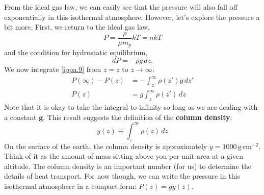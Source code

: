 \documentclass[10pt]{article}
\numberwithin{equation}{section}
\newcommand{\n}{\noindent}
\begin{document}
	\n From the ideal gas law, we can easily see that the pressure will 
also fall off exponentially in this isothermal atmosphere. However, let's 
explore the pressure a bit more. First, we return to the ideal gas law,
	\begin{equation}
		\label{ippa.8} P=\frac{\rho}{\mu m_p}kT=nkT
	\end{equation}
	and the condition for hydrostatic equilibrium,
	\begin{equation}
		\label{ippa.9} dP=-\rho g\,dz.
	\end{equation}
	We now integrate \eqref{ippa.9} from $z=z$ to $z\to \infty$:
	\begin{align}
		\label{ippa.10} P(\infty)-P(z)&=-\int_z^\infty \rho(z') g\,dz'\\
		\label{ippa.11} P(z) &= g\int_z^\infty \rho(z')\,dz
	\end{align}
	Note that it is okay to take the integral to infinity so long as we are 
dealing with a constant $\mathbf{g}$. This result suggests the definition 
of the \textbf{column density}:
	\begin{equation}
		\label{ippa.12} y(z)\equiv \int_z^\infty \rho(z)\,dz
	\end{equation}
	On the surface of the earth, the column density is approximately 
$y=1000\,\mathrm{g\,cm^{-2}}$. Think of it as the amount of mass sitting 
above you per unit area at a given altitude. The column density is an 
important number (for us) to determine the details of heat transport. For 
now though, we can write the pressure in this isothermal atmosphere in a 
compact form: $P(z)=gy(z)$.
\end{document}
